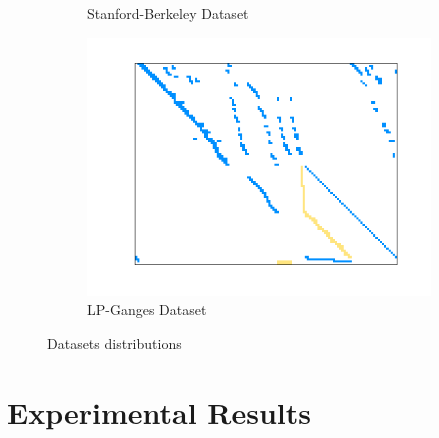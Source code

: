\documentclass[conference]{IEEEtran}
\begin{document}
\begin{figure}
\begin{subfigure}[b]{0.45\linewidth}
        \caption{Stanford-Berkeley Dataset}
        \label{fig:stanford_berkeley}
    \end{subfigure}
    \vspace{0.5cm}
    \begin{subfigure}[b]{0.45\linewidth}
        \includegraphics[width=\linewidth]{images/lp_ganges.png}
        \caption{LP-Ganges Dataset}
        \label{fig:lp_ganges}
    \end{subfigure}
    
    \caption{Datasets distributions}
    \label{fig:Dataset-images}
\end{figure}

\section{Experimental Results}\label{sec:results}
\end{document}
